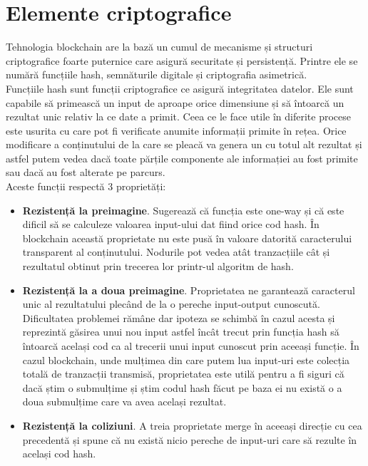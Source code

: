 \clearpage

\section{Elemente criptografice}

Tehnologia blockchain are la bază un cumul de mecanisme și structuri criptografice foarte puternice care asigură securitate și persistență. Printre ele se numără funcțiile hash, semnăturile digitale și criptografia asimetrică.\\

Funcțiile hash sunt funcții criptografice ce asigură integritatea datelor. Ele sunt capabile să primească un input de aproape orice dimensiune și să întoarcă un rezultat unic relativ la ce date a primit. Ceea ce le face utile în diferite procese este usurita cu care pot fi verificate anumite informații primite în rețea. Orice modificare a conținutului de la care se pleacă va genera un cu totul alt rezultat și astfel putem vedea dacă toate părțile componente ale informației au fost primite sau dacă au fost alterate pe parcurs.\\

Aceste funcții respectă 3 proprietăți:
\begin{itemize}
    \item \textbf{Rezistență la preimagine}. Sugerează că funcția este one-way și că este dificil să se calculeze valoarea input-ului dat fiind orice cod hash. În blockchain această proprietate nu este pusă în valoare datorită caracterului transparent al conținutului. Nodurile pot vedea atât tranzacțiile cât și rezultatul obtinut prin trecerea lor printr-ul algoritm de hash.
    
    \item \textbf{Rezistență la a doua preimagine}. Proprietatea ne garantează caracterul unic al rezultatului plecând de la o pereche input-output cunoscută. Dificultatea problemei rămâne dar ipoteza se schimbă în cazul acesta și reprezintă găsirea unui nou input astfel încât trecut prin funcția hash să întoarcă același cod ca al trecerii unui input cunoscut prin aceeași funcție. În cazul blockchain, unde mulțimea din care putem lua input-uri este colecția totală de tranzacții transmisă, proprietatea este utilă pentru a fi siguri că dacă știm o submulțime și știm codul hash făcut pe baza ei nu există o a doua submulțime care va avea același rezultat.
    
    \item \textbf{Rezistență la coliziuni}. A treia proprietate merge în aceeași direcție cu cea precedentă și spune că nu există nicio pereche de input-uri care să rezulte în același cod hash. 
\end{itemize}

